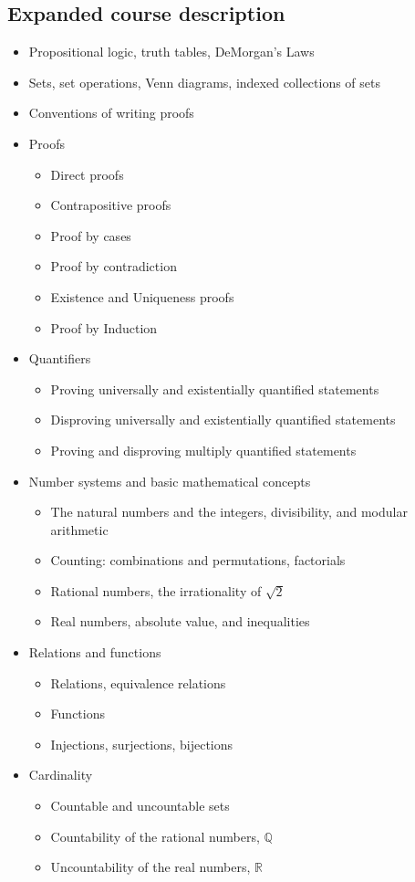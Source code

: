 \documentclass{article}
\theoremstyle{definition}
\begin{document}
\subsection{Expanded course description}
\begin{itemize}
    \item Propositional logic, truth tables, DeMorgan's Laws
    \item Sets, set operations, Venn diagrams, indexed collections of sets
    \item Conventions of writing proofs
    \item Proofs
    \begin{itemize}
        \item Direct proofs
        \item Contrapositive proofs
        \item Proof by cases
        \item Proof by contradiction
        \item Existence and Uniqueness proofs
        \item Proof by Induction
    \end{itemize}
    \item Quantifiers
    \begin{itemize}
        \item Proving universally and existentially quantified statements
        \item Disproving universally and existentially quantified statements
        \item Proving and disproving multiply quantified statements
    \end{itemize}
    \item Number systems and basic mathematical concepts
    \begin{itemize}
        \item The natural numbers and the integers, divisibility, and modular arithmetic
        \item Counting: combinations and permutations, factorials
        \item Rational numbers, the irrationality of $\sqrt{2}$
        \item Real numbers, absolute value, and inequalities
    \end{itemize}
    \item Relations and functions
    \begin{itemize}
        \item Relations, equivalence relations
        \item Functions
        \item Injections, surjections, bijections
    \end{itemize}
    \item Cardinality
    \begin{itemize}
        \item Countable and uncountable sets
        \item Countability of the rational numbers, $\mathbb{Q}$
        \item Uncountability of the real numbers, $\mathbb{R}$
    \end{itemize}
\end{itemize}
\end{document}
